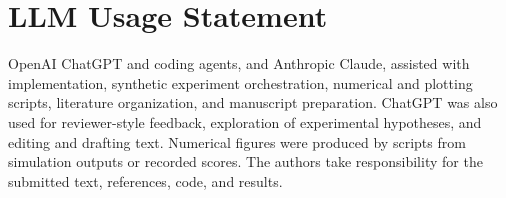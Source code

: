 \documentclass[10pt,twocolumn,letterpaper]{article}
\begin{document}
\clearpage
\section*{LLM Usage Statement}
OpenAI ChatGPT and coding agents, and Anthropic Claude, assisted with implementation, synthetic experiment orchestration, numerical and plotting scripts, literature organization, and manuscript preparation. ChatGPT was also used for reviewer-style feedback, exploration of experimental hypotheses, and editing and drafting text. Numerical figures were produced by scripts from simulation outputs or recorded scores. The authors take responsibility for the submitted text, references, code, and results.

{\small}
\end{document}
